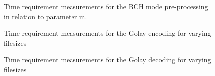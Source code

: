 \begin{figure}
\centering
\caption{Time requirement measurements for the BCH mode pre-processing in relation to parameter m.}
\label{img:bch_time}
\end{figure}


\begin{figure}
\centering
\caption{Time requirement measurements for the Golay encoding for varying filesizes}
\label{img:golay_enc_time}
\end{figure}

\begin{figure}
\centering
\caption{Time requirement measurements for the Golay decoding for varying filesizes}
\label{img:golay_dec_time}
\end{figure}
